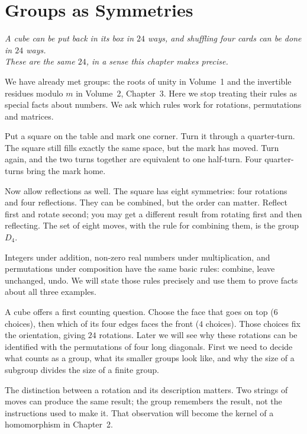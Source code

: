 \chapter{Groups as Symmetries}

\begin{center}\itshape
A cube can be put back in its box in $24$ ways, and shuffling four cards can be done in $24$ ways.\\
These are the same $24$, in a sense this chapter makes precise.
\end{center}

We have already met groups: the roots of unity in Volume~1 and the invertible residues modulo $m$ in Volume~2, Chapter~3. Here we stop treating their rules as special facts about numbers. We ask which rules work for rotations, permutations and matrices.

Put a square on the table and mark one corner. Turn it through a quarter-turn. The square still fills exactly the same space, but the mark has moved. Turn again, and the two turns together are equivalent to one half-turn. Four quarter-turns bring the mark home.

Now allow reflections as well. The square has eight symmetries: four rotations and four reflections. They can be combined, but the order can matter. Reflect first and rotate second; you may get a different result from rotating first and then reflecting. The set of eight moves, with the rule for combining them, is the group $D_4$.

Integers under addition, non-zero real numbers under multiplication, and
permutations under composition have the same basic rules: combine, leave
unchanged, undo. We will state those rules precisely and use them to prove
facts about all three examples.

A cube offers a first counting question. Choose the face that goes on top
($6$ choices), then which of its four edges faces the front ($4$ choices).
Those choices fix the orientation, giving $24$ rotations. Later we will see
why these rotations can be identified with the permutations of four long
diagonals. First we need to decide what counts as a group, what its smaller
groups look like, and why the size of a subgroup divides the size of a finite group.

The distinction between a rotation and its description matters. Two strings of moves can produce the same result; the group remembers the result, not the instructions used to make it. That observation will become the kernel of a homomorphism in Chapter~2.

